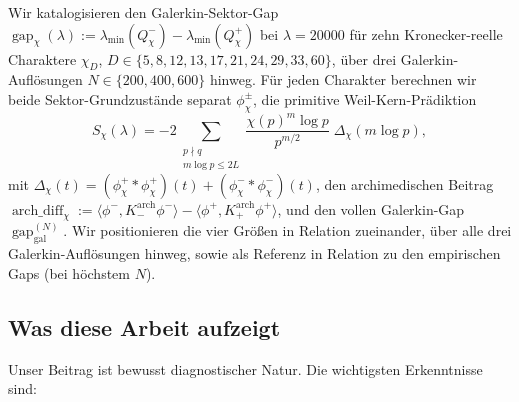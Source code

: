 \documentclass[a4paper,10pt,twocolumn]{article}
\theoremstyle{definition}
\theoremstyle{remark}
\newcommand{\gap}{\operatorname{gap}}
\newcommand{\chifn}{\chi}
\newcommand{\Deltachi}{\Delta_{\chifn}}
\newcommand{\archdiff}{\operatorname{arch\_diff}}
\begin{document}
Wir katalogisieren den Galerkin-Sektor-Gap
$\gap_{\chifn}(\lambda)
  :=\lambda_{\min}(Q^-_{\chifn})-\lambda_{\min}(Q^+_{\chifn})$
bei $\lambda=20000$ für zehn Kronecker-reelle Charaktere
$\chi_D$, $D\in\{5,8,12,13,17,21,24,29,33,60\}$,
über drei Galerkin-Auflösungen $N\in\{200,400,600\}$ hinweg. Für jeden
Charakter berechnen wir beide Sektor-Grundzustände separat
$\phi^\pm_{\chifn}$, die primitive Weil-Kern-Prädiktion
\begin{equation}
\label{eq:predictor}
  S_{\chifn}(\lambda)
    = -2\sum_{\substack{p\nmid q\\m\log p\leq 2L}}
      \frac{\chifn(p)^m\log p}{p^{m/2}}\;\Deltachi(m\log p),
\end{equation}
mit
$\Deltachi(t)
  =(\phi^+_{\chifn}\!*\phi^+_{\chifn})(t)
    +(\phi^-_{\chifn}\!*\phi^-_{\chifn})(t)$,
den archimedischen Beitrag
$\archdiff_{\chifn}
  :=\langle\phi^-,K^{\mathrm{arch}}_-\phi^-\rangle
    -\langle\phi^+,K^{\mathrm{arch}}_+\phi^+\rangle$,
und den vollen Galerkin-Gap $\gap_{\mathrm{gal}}^{(N)}$. Wir positionieren die
vier Größen in Relation zueinander, über alle drei Galerkin-Auflösungen
hinweg, sowie als Referenz in Relation zu den empirischen Gaps (bei höchstem $N$).

\subsection{Was diese Arbeit aufzeigt}
\label{sec:intro-findings}

Unser Beitrag ist bewusst diagnostischer Natur. Die wichtigsten Erkenntnisse sind:
\end{document}
